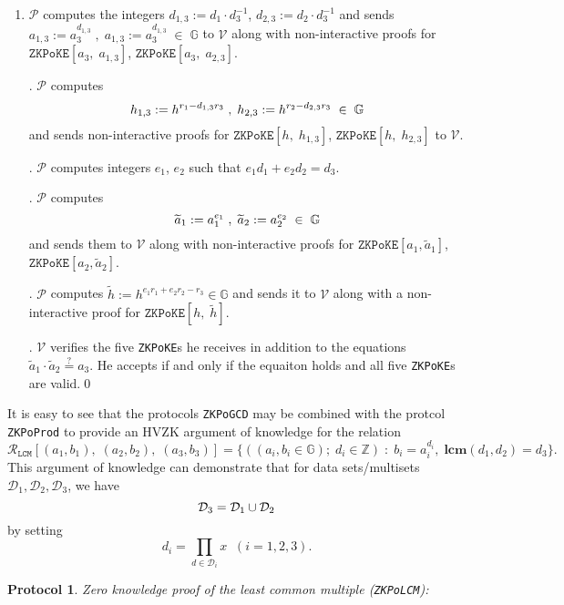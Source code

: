 \documentclass[11pt, lettersize, notitlepage, leqno, footskip=0.6cm]{article}
\newcommand{\bz}{\mathbb Z}
\newcommand{\ttt}{\texttt}
\newcommand{\bG}{\mathbb{G}}
\newcommand{\wti}{\widetilde}
\newcommand{\mc}{\mathcal}
\newcommand{\mb}{\mathbb}
\newcommand{\mbf}{\mathbf}
\newcommand{\mP}{\mc{P}}
\newcommand{\V}{\mc{V}}
\newcommand{\vs}{\vspace{-0.15cm}}
\newcommand{\noin}{\noindent}
\newcommand{\sta}{\stackrel{?}{=}}
\newcommand{\LCM}{\mbf{lcm}}
\newtheorem{Prot}[Thm]{Protocol}
\numberwithin{equation}{section}
\begin{document}
\begin{enumerate}[wide, labelwidth=!, labelindent=0pt]\vs \item $\mP$ computes the integers $d_{1,3}:= d_1\cdot d_3^{-1}$, $d_{2,3}:= d_2\cdot d_3^{-1}$ and sends $a_{1,3}:= a_3^{d_{1,3}}\;,\;a_{1,3}:= a_3^{d_{1,3}}\;\in\;\bG$ to $\V$ along with non-interactive proofs for $\ttt{ZKPoKE}[a_3,\;a_{1,3}]$, $\ttt{ZKPoKE}[a_3,\;a_{2,3}]$.

\noin 2. $\mP$ computes \vs $$h_{1,3}:= h^{r_1 - d_{1,3}r_3}\;,\; h_{2,3}:= h^{r_2 - d_{2,3}r_3}\;\in\;\bG\vs $$ and sends non-interactive proofs for $\ttt{ZKPoKE}[h,\;h_{1,3}]$, $\ttt{ZKPoKE}[h,\;h_{2,3}]$ to $\V$.

\noin 3. $\mP$ computes integers $e_1$, $e_2$ such that $e_1d_1+e_2d_2 = d_3$. 

\noin 4. $\mP$ computes \vs $$ \wti{a}_1:= a_1^{e_1}\;,\;  \wti{a}_2:= a_2^{e_2}\;\in\;\bG \vs $$ and sends them to $\V$ along with non-interactive proofs for $\ttt{ZKPoKE}[a_1,\wti{a}_1]$, $\ttt{ZKPoKE}[a_2,\wti{a}_2]$.

\noin 5. $\mP$ computes $\wti{h}:= h^{e_1r_1+e_2r_2-r_3}\in \bG$ and sends it to $\V$ along with a non-interactive proof for $\ttt{ZKPoKE}[h,\;\wti{h}]$.

\noin 5. $\V$ verifies the five \verb|ZKPoKE|s he receives in addition to the equations $ \wti{a}_1\cdot \wti{a}_2\sta a_3 $. He accepts if and only if the equaiton holds and all five \verb|ZKPoKE|s are valid.\qed \end{enumerate}




\bigskip
\bigskip



It is easy to see that the protocols \verb|ZKPoGCD| may be combined with the protcol \verb|ZKPoProd| to provide an HVZK argument of knowledge for the relation \vs \[ \mc{R}_{{\ttt{LCM}}}[(a_1,b_1),\;(a_2,b_2), \; (a_3, b_3)] = \{((a_i, b_i\in\mb{G});\;d_i\in\bz)\;:\; b_i = a_i^{d_i},\;\LCM(d_1,d_2)=d_3 \} .\] This argument of knowledge can demonstrate that for data sets/multisets $\mc{D}_1,\mc{D}_2, \mc{D}_3$, we have \vs $$\mc{D}_3 = \mc{D}_1\cup \mc{D}_2 \vs $$ by setting \vs $$ d_i = \prod\limits_{d\in\mc{D}_i} x\;\;(i=1,2,3). $$

\vspace{0.1cm}


\begin{Prot} \normalfont \hypertarget{LCM}{\textit{Zero knowledge proof of the least common multiple}} (\verb|ZKPoLCM|):\end{Prot} \vspace{-0.3cm}
\end{document}
